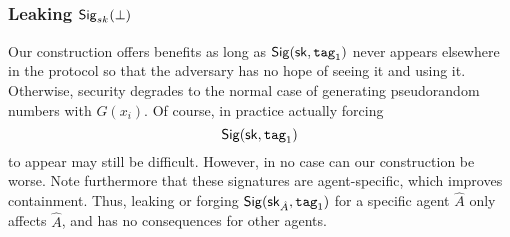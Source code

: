 \documentclass[12pt]{article}
\newcommand{\sigm}[2]{\sig_{sk_{#1}}(#2)}
\newcommand{\gensigm}[1]{\sigm{}{#1}}
\newcommand{\botsig}{\gensigm{\bot}}
\begin{document}
\subsubsection{Leaking $\botsig$ }

Our construction offers benefits as long as $\mathsf{Sig} (\mathsf{sk}, \texttt{tag}_1)$ never appears elsewhere in
the protocol so that the adversary has no hope of seeing it and using
it. Otherwise, security degrades to the normal case of generating
pseudorandom numbers with $G(x_i)$. Of course, in practice actually
forcing $$\mathsf{Sig} (\mathsf{sk}, \texttt{tag}_1)$$ to appear may still be difficult. However,
in no case can our construction be worse. Note furthermore that these
signatures are agent-specific, which improves containment. Thus, leaking
or forging $\mathsf{Sig} (\mathsf{sk}_{\hat A}, \texttt{tag}_1)$ for a specific agent $\hat A$ only affects $\hat A$, and
has no consequences for other agents.




\end{document}
